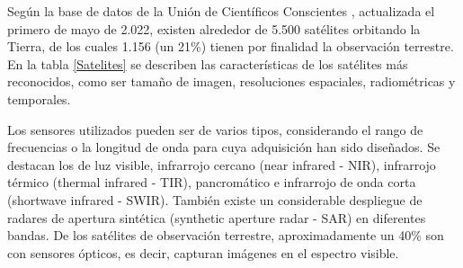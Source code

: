 Según la base de datos de la Unión de Científicos Conscientes \cite{noauthor_satelites_nodate}, actualizada el primero de mayo de 2.022, existen alrededor de 5.500 satélites orbitando la Tierra, de los cuales 1.156 (un 21\%) tienen por finalidad la observación terrestre. En la tabla \ref{Satelites} se describen las características de los satélites más reconocidos, como ser tamaño de imagen, resoluciones espaciales, radiométricas y temporales. 

Los sensores utilizados pueden ser de varios tipos, considerando el rango de frecuencias o la longitud de onda para cuya adquisición han sido diseñados. Se destacan los de luz visible, infrarrojo cercano (near infrared - NIR), infrarrojo térmico (thermal infrared - TIR), pancromático e infrarrojo de onda corta (shortwave infrared - SWIR). También existe un considerable despliegue de radares de apertura sintética (synthetic aperture radar - SAR) en diferentes bandas. De los satélites de observación terrestre, aproximadamente un 40\% son con sensores ópticos, es decir, capturan imágenes en el espectro visible.

